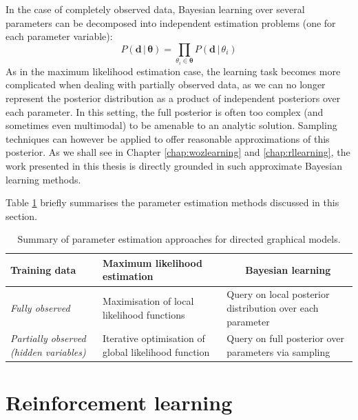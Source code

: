 In the case of completely observed data, Bayesian learning over several parameters can be decomposed into independent estimation problems (one for each parameter variable): 
\begin{equation}
P(\mathbf{d} \, | \, \boldsymbol\theta) = \prod_{\theta_i \in \boldsymbol\theta} P(\mathbf{d} \, | \, \theta_i)
\end{equation}
As in the maximum likelihood estimation case, the learning task becomes more complicated when dealing with partially observed data, as we can no longer represent the posterior distribution as a product of independent posteriors over each parameter.  In this setting, the full posterior is often too complex (and sometimes even multimodal) to be amenable to an analytic solution.  Sampling techniques can however be applied to offer reasonable approximations of this posterior.  As we shall see in Chapter \ref{chap:wozlearning} and \ref{chap:rllearning}, the work presented in this thesis is directly grounded in such approximate Bayesian learning methods. 

Table \ref{table:gmlearning} briefly summarises the parameter estimation methods discussed in this section.

\begin{table}[h]
\renewcommand{\arraystretch}{1.8}
\setlength{\tabcolsep}{10pt}
\vspace{3mm}
\begin{center}
\begin{tabular}{|p{30mm}|p{42mm}|p{48mm}|} \hline 
\centering \textbf{Training data} & \centering \textbf{Maximum likelihood estimation} &  $\ \ \ \ \ \ \ $ \textbf{Bayesian learning} \\ \hline
\textit{Fully observed} & Maximisation of local likelihood functions & Query on local posterior distribution over each parameter \\
\textit{Partially observed (hidden variables)} &  Iterative optimisation of global likelihood function &  Query on full posterior over parameters via sampling \vspace{2mm} \\  \hline
\end{tabular}
\end{center}
\caption{Summary of parameter estimation approaches for directed graphical models.}
\label{table:gmlearning}
\end{table}


\section{Reinforcement learning}
\label{sec:rl}

